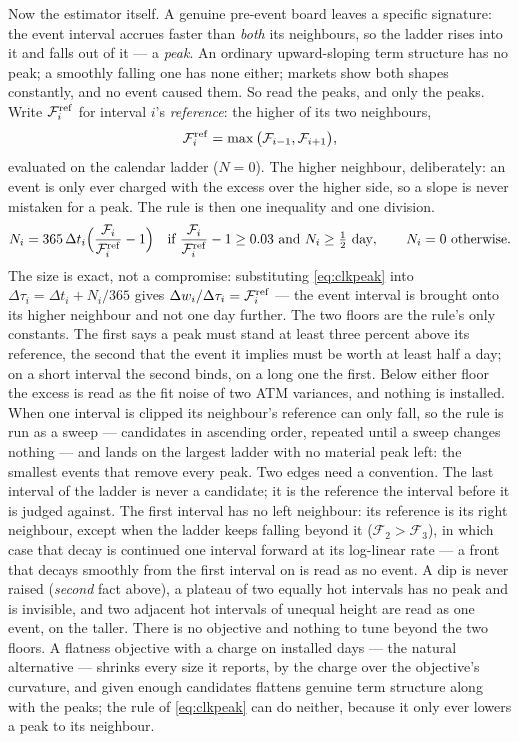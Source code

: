 Now the estimator itself.  A genuine pre-event board leaves a
specific signature: the event interval accrues faster than
\emph{both} its neighbours, so the ladder rises into it and falls out
of it --- a \emph{peak}.  An ordinary upward-sloping term structure
has no peak; a smoothly falling one has none either; markets show
both shapes constantly, and no event caused them.  So read the peaks,
and only the peaks.  Write $\mathcal{F}_i^{\rm ref}$ for interval
$i$'s \emph{reference}: the higher of its two neighbours,
\begin{equation}
\mathcal{F}_i^{\rm ref}=\max\big(\mathcal{F}_{i-1},\mathcal{F}_{i+1}\big),
\label{eq:clkref}
\end{equation}
evaluated on the calendar ladder ($N=0$).  The higher neighbour,
deliberately: an event is only ever charged with the excess over the
higher side, so a slope is never mistaken for a peak.  The rule is
then one inequality and one division.
\begin{equation}
N_i=365\,\Delta t_i\Big(\frac{\mathcal{F}_i}{\mathcal{F}_i^{\rm ref}}-1\Big)
\quad\text{if }
\frac{\mathcal{F}_i}{\mathcal{F}_i^{\rm ref}}-1\ge0.03
\text{ and } N_i\ge\tfrac12\text{ day},
\qquad N_i=0\text{ otherwise.}
\label{eq:clkpeak}
\end{equation}
The size is exact, not a compromise: substituting \eqref{eq:clkpeak}
into $\Delta\tau_i=\Delta t_i+N_i/365$ gives
$\Delta w_i/\Delta\tau_i=\mathcal{F}_i^{\rm ref}$ --- the event
interval is brought onto its higher neighbour and not one day
further.  The two floors are the rule's only constants.  The first
says a peak must stand at least three percent above its reference,
the second that the event it implies must be worth at least half a
day; on a short interval the second binds, on a long one the first.
Below either floor the excess is read as the fit noise of two ATM
variances, and nothing is installed.  When one interval is clipped
its neighbour's reference can only fall, so the rule is run as a
sweep --- candidates in ascending order, repeated until a sweep
changes nothing --- and lands on the largest ladder with no material
peak left: the smallest events that remove every peak.  Two edges
need a convention.  The last interval of the ladder is never a
candidate; it is the reference the interval before it is judged
against.  The first interval has no left neighbour: its reference is
its right neighbour, except when the ladder keeps falling beyond it
($\mathcal{F}_2>\mathcal{F}_3$), in which case that decay is
continued one interval forward at its log-linear rate --- a front
that decays smoothly from the first interval on is read as no event.
A dip is never raised (\emph{second} fact above), a plateau of two
equally hot intervals has no peak and is invisible, and two adjacent
hot intervals of unequal height are read as one event, on the
taller.  There is no objective and nothing to tune beyond the two
floors.  A flatness objective with a charge on installed days ---
the natural alternative --- shrinks every size it reports, by the
charge over the objective's curvature, and given enough candidates
flattens genuine term structure along with the peaks; the rule of
\eqref{eq:clkpeak} can do neither, because it only ever lowers a peak
to its neighbour.

